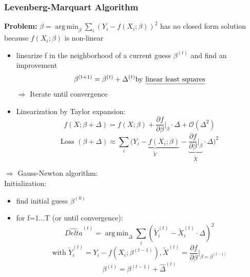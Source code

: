 \documentclass[11pt]{article}
\DeclareMathOperator*{\argmin}{arg\,min}
\begin{document}
    \subsubsection{Levenberg-Marquart Algorithm}
    \textbf{Problem: } $\hat{\beta}=\argmin_\beta \sum_i (Y_i-f(X_i;\beta))^2$
    has no closed form solution because $f(X_i;\beta)$ is non-linear
    \begin{itemize}
      \item linearize f in the neighborhood of a current guess $\beta^{(t)}$ and
      find an improvement
      \begin{equation*}
        \beta^{(t+1)}=\beta^{(t)}+\Delta^{(t)} \text{by \underline{linear least squares}}
      \end{equation*}
      $\Rightarrow$ Iterate until convergence
      \item Linearization by Taylor expansion:
      \begin{equation*}
        f(X;\beta+\Delta) = f(X;\beta)+\frac{\partial f}{\partial \beta} \bigg \vert_\beta
        \cdot \Delta + \mathcal{O}(\Delta^2)
      \end{equation*}
      \begin{equation*}
        \text{Loss } (\beta+\Delta) \approx \sum_i \underbrace{(Y_i-f(X_i;\beta)}_{\tilde{Y}}-
        \underbrace{\frac{\partial f}{\partial \beta} \bigg \vert_\beta}_{\tilde{X}} \cdot \Delta)^2
      \end{equation*}
    \end{itemize}
    $\Rightarrow$ Gauss-Newton algorithm: \\
    Initialization:
    \begin{itemize}
      \item find initial guess $\beta^{(0)}$
      \item for f=1...T (or until convergence):
      \begin{equation*}
        \hat{Delta}^{(t)} = \argmin_{\Delta} \sum_i (\tilde{Y}_i^{(t)}-\tilde{X}_i^{(t)} \cdot \Delta)^2
      \end{equation*}
      \begin{equation*}
        \text{with } \tilde{Y}_i^{(t)}=Y_i-f(X_i;\beta^{(t-1)}), \tilde{X}^{(t)}=
        \frac{\partial f}{\partial \beta} \bigg \vert_{\beta=\beta^{(t-1)}}
      \end{equation*}
      \begin{equation*}
        \beta^{(t)}=\beta^{(t-1)}+\hat{\Delta}^{(t)}
      \end{equation*}
    \end{itemize}
\end{document}
